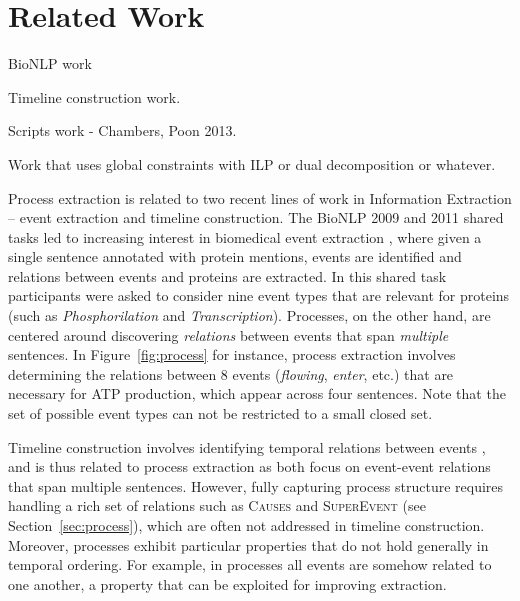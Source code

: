 \section{Related Work}

BioNLP work

Timeline construction work.

Scripts work - Chambers, Poon 2013.

Work that uses global constraints with ILP or dual decomposition or whatever.

Process extraction is related to two recent lines of work in Information Extraction -- event extraction and timeline construction. The BioNLP 2009 and 2011 shared tasks \cite{kim09,kim11} led to increasing interest in biomedical event extraction \cite{Poon10,Miwa10,riedel11fast,Mcclosky11,Bjorne11}, where given a single sentence annotated with protein mentions, events are identified and relations between events and proteins are extracted. In this shared task participants were asked to consider nine event types that are relevant for proteins (such as \emph{Phosphorilation} and \emph{Transcription}). Processes, on the other hand,  are centered around discovering \emph{relations} between events that span \emph{multiple} sentences. In Figure~\ref{fig:process} for instance, process extraction involves determining the relations between 8 events (\emph{flowing}, \emph{enter}, etc.) that are necessary for ATP production, which appear across four sentences. Note that the set of possible event types can not be restricted to a small closed set.

Timeline construction involves identifying temporal relations between events \cite{Chambers08,Yoshikawa09,Denis11,Do12,Mcclosky12}, and is thus related to process extraction as both focus on event-event relations that span multiple sentences. However, fully capturing process structure requires handling a rich set of relations such as \textsc{Causes} and \textsc{SuperEvent} (see Section~\ref{sec:process}), which are often not addressed in timeline construction. Moreover, processes exhibit particular properties that do not hold generally in temporal ordering. For example, in processes all events are somehow related to one another, a property that can be exploited for improving extraction.
 

